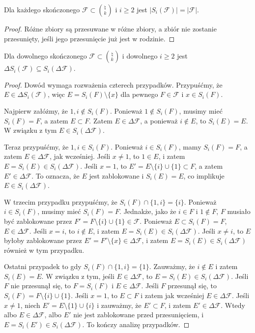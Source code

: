 \begin{lemma}
	\label{kk_rozmiar}
	Dla każdego skończonego $\mathcal F\subset \binom{\natural}{k}$ i $i\ge 2$ jest
	$|S_i(\mathcal F)| = |\mathcal F|$.
\end{lemma}
\begin{proof}
	Różne zbiory są przesuwane w różne zbiory, a zbiór nie zostanie przesunięty,
	jeśli jego przesunięcie już jest w rodzinie.
\end{proof}

\begin{lemma}
	\label{kk_zamiana}
	Dla dowolnego skończonego $\mathcal F \subset \binom{\natural}{k}$ i dowolnego $i
		\geq 2$ jest $\Delta S_i(\mathcal F) \subseteq S_i(\Delta\mathcal F)$.
\end{lemma}
\begin{proof}
	Dowód wymaga rozważenia czterech przypadków. Przypuśćmy, że $E \in \Delta
		S_i(\mathcal F)$, więc $E = S_i(F) \setminus \{x\}$ dla pewnego $F \in
		\mathcal F$ i $x \in S_i(F)$.

	Najpierw załóżmy, że $1, i \notin S_i(F)$. Ponieważ $1 \notin S_i(F)$, musimy
	mieć $S_i(F) = F$, a zatem $E \subset F$. Zatem $E \in \Delta\mathcal  F$, a
	ponieważ $i \notin E$, to $S_i(E) = E$. W związku z tym $E \in
		S_i(\Delta\mathcal F)$.

	Teraz przypuśćmy, że $1, i \in S_i(F)$. Ponieważ $i \in S_i(F)$, mamy $S_i(F)
		= F$, a zatem $E \in \Delta\mathcal F$, jak wcześniej. Jeśli $x \neq 1$, to
	$1 \in E$, i zatem $E = S_i(E) \in S_i(\Delta\mathcal F)$. Jeśli $x = 1$, to
	$E' = E \setminus \{i\} \cup \{1\} \subset F$, a zatem $E' \in \Delta\mathcal
		F$. To oznacza, że $E$ jest zablokowane i $S_i(E) = E$, co implikuje $E \in
		S_i(\Delta\mathcal F)$.

	W trzecim przypadku przypuśćmy, że $S_i(F) \cap \{1, i\} = \{i\}$. Ponieważ $i
		\in S_i(F)$, musimy mieć $S_i(F) = F$. Jednakże, jako że $i \in F$ i $1
		\notin F$, $F$ musiało być zablokowane przez $F' = F \setminus \{i\} \cup
		\{1\} \in\mathcal F$. Ponieważ $E \subset S_i(F) = F$, $E \in \Delta\mathcal
		F$. Jeśli $x = i$, to $i \notin E$, i zatem $E = S_i(E) \in
		S_i(\Delta\mathcal F)$. Jeśli $x \neq i$, to $E$ byłoby zablokowane przez $E'
		= F' \setminus \{x\} \in \Delta\mathcal F$, i zatem $E = S_i(E) \in
		S_i(\Delta\mathcal F)$ również w tym przypadku.

	Ostatni przypadek to gdy $S_i(F) \cap \{1, i\} = \{1\}$. Zauważmy, że $i
		\notin E$ i zatem $S_i(E) = E$. W związku z tym, jeśli $E \in \Delta\mathcal
		F$, to $E = S_i(E) \in S_i(\Delta\mathcal F)$. Jeśli $F$ nie przesunął się,
	to $F = S_i(F)$ i $E \in \Delta\mathcal F$. Jeśli $F$ przesunął się, to
	$S_i(F) = F \setminus \{i\} \cup \{1\}$. Jeśli $x = 1$, to $E \subset F$ i
	zatem jak wcześniej $E \in \Delta\mathcal F$. Jeśli $x \neq 1$, niech $E' = E
		\setminus \{1\} \cup \{i\}$ i zauważmy, że $E' \subset F$, i zatem $E' \in
		\Delta\mathcal F$. Wtedy albo $E \in \Delta\mathcal F$, albo $E'$ nie jest
	zablokowane przed przesunięciem, i $E = S_i(E') \in S_i(\Delta\mathcal F)$.
	To kończy analizę przypadków.
\end{proof}

